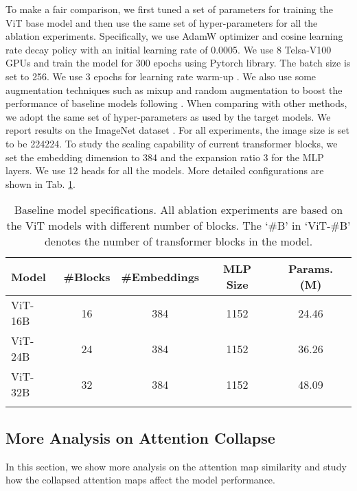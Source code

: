 \documentclass[10pt,twocolumn,letterpaper]{article}
\begin{document}
To make a fair comparison, we first tuned a set of parameters 
for training the ViT base model and then use the same set of hyper-parameters for all the ablation experiments.
Specifically, we use AdamW optimizer \cite{loshchilov2017decoupled} and cosine  learning rate decay policy with an
initial learning rate of 0.0005. We use 8 Telsa-V100 GPUs and train the model for 300 epochs using Pytorch \cite{paszke2019pytorch} library. 
The batch size is set to 256.  
We use 3 epochs for learning rate warm-up \cite{loshchilov2016sgdr}. We also use some  augmentation techniques such as mixup \cite{zhang2017mixup} and random augmentation \cite{cubuk2020randaugment} to boost the performance of baseline models following \cite{zhang2020resnest}. 
When comparing with other methods, we adopt the same set of hyper-parameters as used by the target models. 
We report results on the ImageNet dataset \cite{krizhevsky2012imagenet}. For all experiments, the image size is set to be 224224. 
To study the scaling capability of current transformer blocks,
we set the embedding dimension to 384 and the expansion ratio 3
for the MLP layers. We use 12 heads for all the models. More detailed configurations are shown in Tab. \ref{tab:ablation_depth}.

\begin{table}[h]
\footnotesize
\caption{Baseline model specifications. All ablation experiments are based on the ViT models with different number of blocks. The `\#B' in `ViT-\#B' denotes the number of transformer blocks in the model.}
\label{tab:ablation_depth}
\centering
\begin{tabular}{lcccc}
\toprule
\bf Model
&\bf \#Blocks
&\bf \#Embeddings

&\bf MLP Size
&\bf Params. (M)
\\ \midrule ViT-16B & 16 & 384 & 1152 & 24.46 \\
 ViT-24B & 24 & 384 & 1152 & 36.26 \\
 ViT-32B & 32 & 384 & 1152 & 48.09 \\
\bottomrule
\vspace{-5mm}
\end{tabular}
\end{table}


\subsection{More Analysis on Attention Collapse}

In this section, we show more  analysis on the attention map similarity  and study how the collapsed attention maps affect the model performance. 
\end{document}

